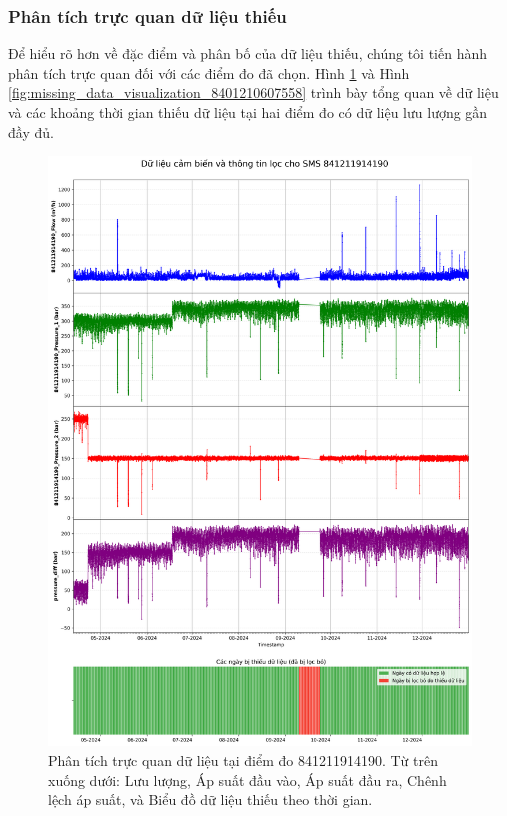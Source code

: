 \subsubsection{Phân tích trực quan dữ liệu thiếu}

Để hiểu rõ hơn về đặc điểm và phân bố của dữ liệu thiếu, chúng tôi tiến hành phân tích trực quan đối với các điểm đo đã chọn. Hình \ref{fig:missing_data_visualization_841211914190} và Hình \ref{fig:missing_data_visualization_8401210607558} trình bày tổng quan về dữ liệu và các khoảng thời gian thiếu dữ liệu tại hai điểm đo có dữ liệu lưu lượng gần đầy đủ.

\begin{figure}[htbp]
    \centering
    \includegraphics[width=\textwidth]{image/section6_1/timeseries_combined_841211914190.png}
    \caption{Phân tích trực quan dữ liệu tại điểm đo 841211914190. Từ trên xuống dưới: Lưu lượng, Áp suất đầu vào, Áp suất đầu ra, Chênh lệch áp suất, và Biểu đồ dữ liệu thiếu theo thời gian.}
    \label{fig:missing_data_visualization_841211914190}
\end{figure}

